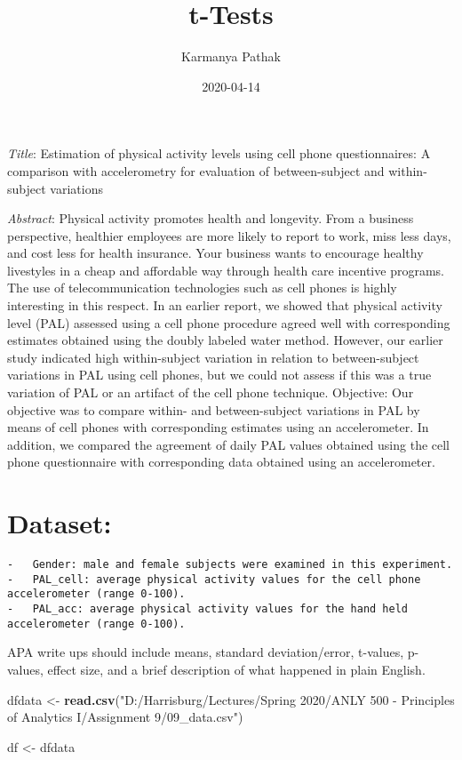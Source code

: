 \documentclass[
]{article}
\title{t-Tests}
\author{Karmanya Pathak}
\date{2020-04-14}
\newenvironment{Shaded}{\begin{snugshade}}{\end{snugshade}}
\newcommand{\KeywordTok}[1]{\textcolor[rgb]{0.13,0.29,0.53}{\textbf{#1}}}
\newcommand{\NormalTok}[1]{#1}
\newcommand{\StringTok}[1]{\textcolor[rgb]{0.31,0.60,0.02}{#1}}
\begin{document}
\maketitle

\emph{Title}: Estimation of physical activity levels using cell phone
questionnaires: A comparison with accelerometry for evaluation of
between-subject and within-subject variations

\emph{Abstract}: Physical activity promotes health and longevity. From a
business perspective, healthier employees are more likely to report to
work, miss less days, and cost less for health insurance. Your business
wants to encourage healthy livestyles in a cheap and affordable way
through health care incentive programs. The use of telecommunication
technologies such as cell phones is highly interesting in this respect.
In an earlier report, we showed that physical activity level (PAL)
assessed using a cell phone procedure agreed well with corresponding
estimates obtained using the doubly labeled water method. However, our
earlier study indicated high within-subject variation in relation to
between-subject variations in PAL using cell phones, but we could not
assess if this was a true variation of PAL or an artifact of the cell
phone technique. Objective: Our objective was to compare within- and
between-subject variations in PAL by means of cell phones with
corresponding estimates using an accelerometer. In addition, we compared
the agreement of daily PAL values obtained using the cell phone
questionnaire with corresponding data obtained using an accelerometer.

\hypertarget{dataset}{%
\section{Dataset:}\label{dataset}}

\begin{verbatim}
-   Gender: male and female subjects were examined in this experiment.
-   PAL_cell: average physical activity values for the cell phone accelerometer (range 0-100).
-   PAL_acc: average physical activity values for the hand held accelerometer (range 0-100).
\end{verbatim}

APA write ups should include means, standard deviation/error, t-values,
p-values, effect size, and a brief description of what happened in plain
English.

\begin{Shaded}
\begin{Highlighting}[]
\NormalTok{dfdata <-}\StringTok{ }\KeywordTok{read.csv}\NormalTok{(}\StringTok{"D:/Harrisburg/Lectures/Spring 2020/ANLY 500 - Principles of Analytics I/Assignment 9/09_data.csv"}\NormalTok{)}

\NormalTok{df <-}\StringTok{ }\NormalTok{dfdata}
\end{Highlighting}
\end{Shaded}
\end{document}

